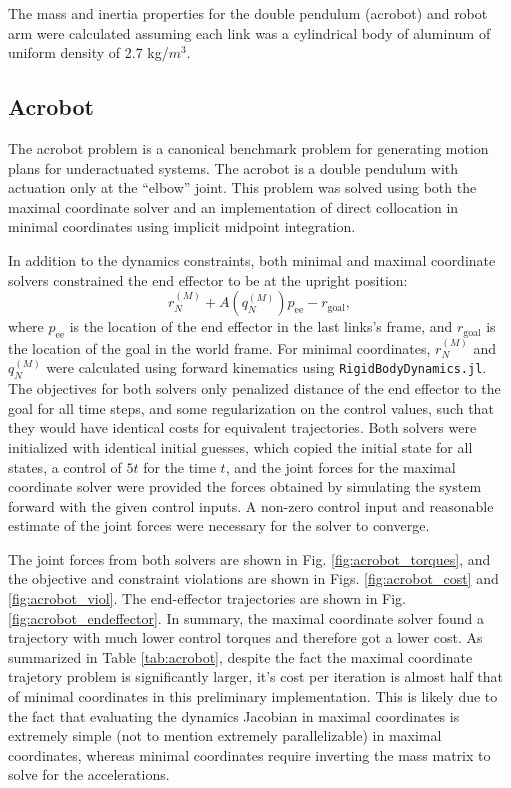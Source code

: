 \documentclass[../root.tex]{subfiles}
\begin{document}
The mass and inertia properties for the double pendulum (acrobot) and robot arm were 
calculated assuming each link was a cylindrical body of aluminum of uniform density of 
2.7 kg/$m^3$.

\subsection{Acrobot}
The acrobot problem is a canonical benchmark problem for generating motion plans for 
underactuated systems. The acrobot is a double pendulum with actuation only at the ``elbow''
joint. This problem was solved using both the maximal coordinate solver and an implementation
of direct collocation in minimal coordinates using implicit midpoint integration.

In addition to the dynamics constraints, both minimal and maximal coordinate solvers 
constrained the end effector to be at the upright position:
\begin{equation}
    r_N^{(M)} + A(q_N^{(M)}) p_\text{ee} - r_\text{goal},
\end{equation}
where $p_\text{ee}$ is the location of the end effector in the last links's frame, and
$r_\text{goal}$ is the location of the goal in the world frame.
For minimal coordinates, $r_N^{(M)}$ and $q_N^{(M)}$ were calculated using forward 
kinematics using \texttt{RigidBodyDynamics.jl}. The objectives for both solvers only 
penalized distance of the end effector to the goal for all time steps, and some 
regularization on the control values, such that they would have identical costs for 
equivalent trajectories. Both solvers were initialized with identical 
initial guesses, which copied the initial state for all states, a control of $5 t$ for 
the time $t$, and the joint forces for the maximal coordinate solver were provided the forces 
obtained by simulating the system forward with the given control inputs. A non-zero control 
input and reasonable estimate of the joint forces were necessary for the solver to converge.

The joint forces from both solvers are shown in Fig. \ref{fig:acrobot_torques}, and the 
objective and constraint violations are shown in Figs. \ref{fig:acrobot_cost} and 
\ref{fig:acrobot_viol}. The end-effector trajectories are shown in Fig. 
\ref{fig:acrobot_endeffector}. In summary, the maximal coordinate solver found a trajectory 
with much lower control torques and therefore got a lower cost. As summarized in Table 
\ref{tab:acrobot}, despite the fact the maximal coordinate trajetory problem is significantly
larger, it's cost per iteration is almost half that of minimal coordinates in this 
preliminary implementation. This is likely due to the fact that evaluating the dynamics Jacobian
in maximal coordinates is extremely simple (not to mention extremely parallelizable) in 
maximal coordinates, whereas minimal coordinates require inverting the mass matrix to solve 
for the accelerations. 
\end{document}
